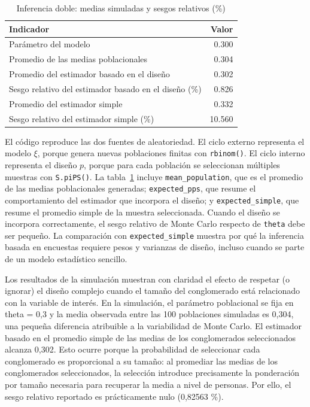 \documentclass[
  spanish,
  11pt,
  letterpaper,
  oneside,
  open=any]{scrbook}
\begin{document}
{

\begin{longtable}[]{@{}lr@{}}

\caption{\label{tbl-ap2-double-simulation}Inferencia doble: medias
simuladas y sesgos relativos (\%)}

\tabularnewline

\toprule\noalign{}
Indicador & Valor \\
\midrule\noalign{}
\endhead
\bottomrule\noalign{}
\endlastfoot
Parámetro del modelo & 0.300 \\
Promedio de las medias poblacionales & 0.304 \\
Promedio del estimador basado en el diseño & 0.302 \\
Sesgo relativo del estimador basado en el diseño (\%) & 0.826 \\
Promedio del estimador simple & 0.332 \\
Sesgo relativo del estimador simple (\%) & 10.560 \\

\end{longtable}

}

El código reproduce las dos fuentes de aleatoriedad. El ciclo externo
representa el modelo \(\xi\), porque genera nuevas poblaciones finitas
con \texttt{rbinom()}. El ciclo interno representa el diseño \(p\),
porque para cada población se seleccionan múltiples muestras con
\texttt{S.piPS()}. La tabla~\ref{tbl-ap2-double-simulation} incluye
\texttt{mean\_population}, que es el promedio de las medias
poblacionales generadas; \texttt{expected\_pps}, que resume el
comportamiento del estimador que incorpora el diseño; y
\texttt{expected\_simple}, que resume el promedio simple de la muestra
seleccionada. Cuando el diseño se incorpora correctamente, el sesgo
relativo de Monte Carlo respecto de \texttt{theta} debe ser pequeño. La
comparación con \texttt{expected\_simple} muestra por qué la inferencia
basada en encuestas requiere pesos y varianzas de diseño, incluso cuando
se parte de un modelo estadístico sencillo.

Los resultados de la simulación muestran con claridad el efecto de
respetar (o ignorar) el diseño complejo cuando el tamaño del
conglomerado está relacionado con la variable de interés. En la
simulación, el parámetro poblacional se fija en theta = 0,3 y la media
observada entre las 100 poblaciones simuladas es 0,304, una pequeña
diferencia atribuible a la variabilidad de Monte Carlo. El estimador
basado en el promedio simple de las medias de los conglomerados
seleccionados alcanza 0,302. Esto ocurre porque la probabilidad de
seleccionar cada conglomerado es proporcional a su tamaño: al promediar
las medias de los conglomerados seleccionados, la selección introduce
precisamente la ponderación por tamaño necesaria para recuperar la media
a nivel de personas. Por ello, el sesgo relativo reportado es
prácticamente nulo (0,82563 \%).
\end{document}
